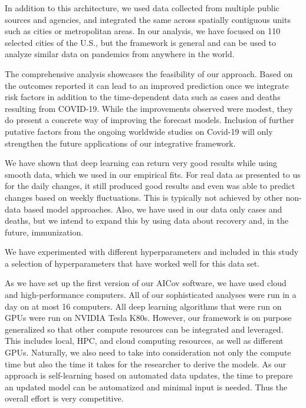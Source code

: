 \documentclass[a4paper, inpress]{jds} %
\renewcommand{\_}{%
    \textunderscore\hspace{0pt}%
}
\begin{document}
In addition to this architecture, we used data collected from multiple
public sources and agencies, and integrated the same across spatially
contiguous units such as cities or metropolitan areas. In our
analysis, we have focused on 110 selected cities of the U.S., but the
framework is general and can be used to analyze similar data on
pandemics from anywhere in the world.

The comprehensive analysis showcases the feasibility of our
approach. Based on the outcomes reported it can lead to an improved
prediction once we integrate risk factors in addition to the
time-dependent data such as cases and deaths resulting from
COVID-19. While the improvements observed were modest, they do present
a concrete way of improving the forecast models. Inclusion of further
putative factors from the ongoing worldwide studies on Covid-19 will
only strengthen the future applications of our integrative framework.

We have shown that deep learning can return very good results while
using smooth data, which we used in our empirical fits. For real data
as presented to us for the daily changes, it still produced good
results and even was able to predict changes based on weekly
fluctuations. This is typically not achieved by other non-data based
model approaches. Also, we have used in our data only cases and
deaths, but we intend to expand this by using data about recovery and,
in the future, immunization.

We have experimented with different hyperparameters and included in
this study a selection of hyperparameters that have worked well for
this data set.


As we have set up the first version of our AICov software, we have
used cloud and high-performance computers. All of our sophisticated
analyses were run in a day on at most 16 computers. All deep learning
algorithms that were run on GPUs were run on NVIDIA Tesla
K80s. However, our framework is on purpose generalized so that other
compute resources can be integrated and leveraged. This includes
local, HPC, and cloud computing resources, as well as different
GPUs. Naturally, we also need to take into consideration not only the
compute time but also the time it takes for the researcher to derive
the models. As our approach is self-learning based on automated data
updates, the time to prepare an updated model can be automatized and
minimal input is needed. Thus the overall effort is very competitive.


\end{document}
